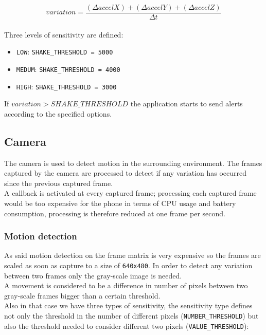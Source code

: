 \documentclass[conference, 11pt]{IEEEtran}
\begin{document}
\begin{equation}
variation = \frac{(\Delta accelX)+(\Delta accelY)+(\Delta accelZ)}{\Delta t}
\label{eq:accel_variation}
\end{equation}
\vspace{.5cm}\\
Three levels of sensitivity are defined:
\begin{itemize}
	\item \texttt{LOW}: \texttt{SHAKE\_THRESHOLD = 5000}
	\item \texttt{MEDUM}:  \texttt{SHAKE\_THRESHOLD = 4000}
	\item \texttt{HIGH}:  \texttt{SHAKE\_THRESHOLD = 3000}
\end{itemize}

If $variation>SHAKE\_THRESHOLD$ the application starts to send alerts according to the specified options.

\subsection{\textbf{Camera}}
The camera is used to detect motion in the surrounding environment. The frames captured by the camera are processed to detect if any variation has occurred since the previous captured frame.\\
A callback is activated at every captured frame; processing each captured frame would be too expensive for the phone in terms of CPU usage and battery consumption, processing is therefore reduced at one frame per second.\\
\subsubsection{\textbf{Motion detection}}
As said motion detection on the frame matrix is very expensive so the frames are scaled as soon as capture to a size of \texttt{640x480}. In order to detect any variation between two frames only the gray-scale image is needed.\\
A movement is considered to be a difference in number of pixels between two gray-scale frames bigger than a certain threshold.\\
Also in that case we have three types of sensitivity, the sensitivity type defines not only the threshold in the number of different pixels (\texttt{NUMBER\_THRESHOLD}) but also the threshold needed to consider different two pixels (\texttt{VALUE\_THRESHOLD}):\\
\end{document}
